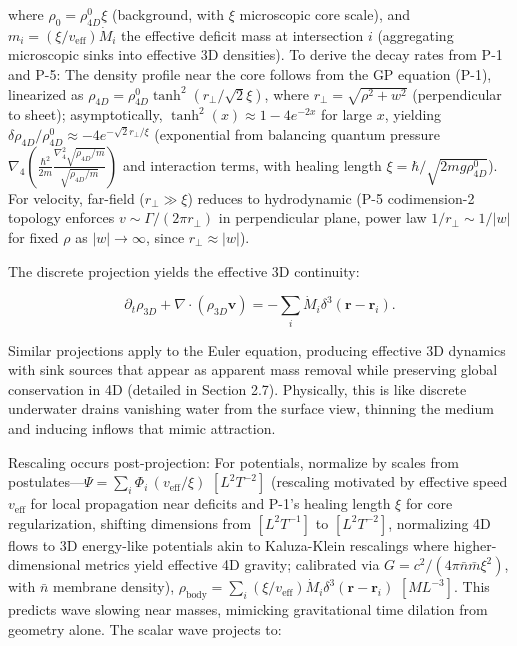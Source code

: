 where $\rho_0 = \rho_{4D}^0 \xi$ (background, with $\xi$ microscopic core scale), and $m_i = (\xi / v_{\text{eff}}) \dot{M}_i$ the effective deficit mass at intersection $i$ (aggregating microscopic sinks into effective 3D densities). To derive the decay rates from P-1 and P-5: The density profile near the core follows from the GP equation (P-1), linearized as $\rho_{4D} = \rho_{4D}^0 \tanh^2 (r_\perp / \sqrt{2} \xi)$, where $r_\perp = \sqrt{\rho^2 + w^2}$ (perpendicular to sheet); asymptotically, $\tanh^2(x) \approx 1 - 4 e^{-2x}$ for large $x$, yielding $\delta \rho_{4D} / \rho_{4D}^0 \approx -4 e^{-\sqrt{2} r_\perp / \xi}$ (exponential from balancing quantum pressure $\nabla_4 \left( \frac{\hbar^2}{2 m} \frac{\nabla_4^2 \sqrt{\rho_{4D}/m}}{\sqrt{\rho_{4D}/m}} \right)$ and interaction terms, with healing length $\xi = \hbar / \sqrt{2 m g \rho_{4D}^0}$). For velocity, far-field ($r_\perp \gg \xi$) reduces to hydrodynamic (P-5 codimension-2 topology enforces $v \sim \Gamma / (2\pi r_\perp)$ in perpendicular plane, power law $1/r_\perp \sim 1/|w|$ for fixed $\rho$ as $|w| \to \infty$, since $r_\perp \approx |w|$).

The discrete projection yields the effective 3D continuity:

\[
\partial_t \rho_{3D} + \nabla \cdot (\rho_{3D} \mathbf{v}) = -\sum_i \dot{M}_i \delta^3(\mathbf{r} - \mathbf{r}_i).
\]

Similar projections apply to the Euler equation, producing effective 3D dynamics with sink sources that appear as apparent mass removal while preserving global conservation in 4D (detailed in Section 2.7). Physically, this is like discrete underwater drains vanishing water from the surface view, thinning the medium and inducing inflows that mimic attraction.

Rescaling occurs post-projection: For potentials, normalize by scales from postulates---$\Psi = \sum_i \Phi_i \, (v_{\text{eff}} / \xi)$ $[L^2 T^{-2}]$ (rescaling motivated by effective speed $v_{\text{eff}}$ for local propagation near deficits and P-1's healing length $\xi$ for core regularization, shifting dimensions from $[L^2 T^{-1}]$ to $[L^2 T^{-2}]$, normalizing 4D flows to 3D energy-like potentials akin to Kaluza-Klein rescalings where higher-dimensional metrics yield effective 4D gravity; calibrated via $G = c^2 / (4\pi \bar{n} \bar{m} \xi^2)$, with $\bar{n}$ membrane density), $\rho_{\text{body}} = \sum_i \left( \xi / v_{\text{eff}} \right) \dot{M}_i \delta^3(\mathbf{r} - \mathbf{r}_i)$ $[M L^{-3}]$. This predicts wave slowing near masses, mimicking gravitational time dilation from geometry alone. The scalar wave projects to:

